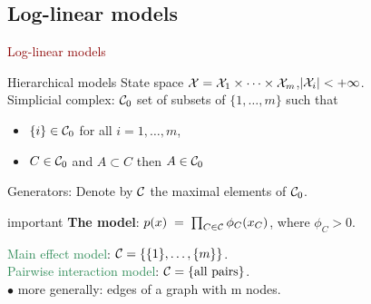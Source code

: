 \documentclass[11pt,handout,aspectratio=169,dvipsnames]{beamer}
\begin{document}
\subsection{Log-linear models}

\begin{frame}{}
\begin{center}
	{\huge \textcolor{DarkRed}{Log-linear models}}
\end{center}
\end{frame}


\begin{frame}{Hierarchical models}
	State space ${\cal X}={\cal X}_1\times \cdots\times {\cal X}_m$,\quad  $|{\cal X}_i|<+\infty$.\\[.2cm]
	Simplicial complex: ${\cal C}_0$ set of subsets of $\{1,\ldots,m\}$ such that
	\begin{itemize}
	\item $\{i\}\in {\cal C}_0$ for all $i=1,\ldots,m$,
	\item $C\in {\cal C}_0$ and $A\subset C$ then $A\in {\cal C}_0$
\end{itemize}

	\alert{Generators}: Denote by ${\cal C}$ the maximal elements of ${\cal C}_0$.\\[.4cm]
	

	\begin{beamercolorbox}[wd=\paperwidth,sep=3pt]{important}
		\textbf{The model}: $p(x)\;=\;\prod_{C\in {\cal C}} \phi_C(x_C)$, \;\;where $\phi_C>0$.
	\end{beamercolorbox}
	\bigskip
	
	\textcolor{SeaGreen}{Main effect model}: ${\cal C}=\{\{1\},\ldots,\{m\}\}$.\\[.3cm]
	\textcolor{SeaGreen}{Pairwise interaction model}: ${\cal C}=\{\mbox{all pairs}\}$.\\
	\qquad $\bullet$ more generally: edges of a graph with m nodes.
\end{frame}
\end{document}
